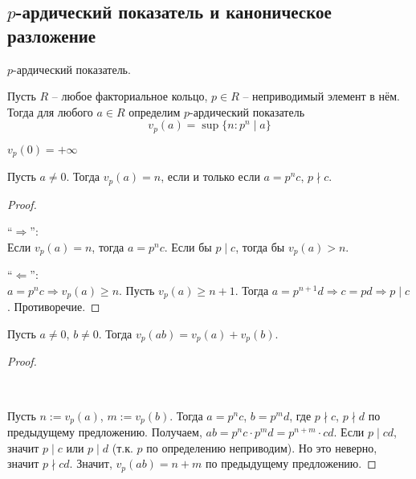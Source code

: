 
\begin{normalsize}
\section{$p$-ардический показатель и каноническое разложение}

\begin{conj}
    $p$-ардический показатель.
\end{conj}
    
Пусть $R$ -- любое факториальное кольцо, $p \in R$ --
неприводимый элемент в нём. Тогда для любого $a \in R$
определим $p$-ардический показатель
\[v_p(a) = \sup\{ n : p^n \mid a \}\]

\notice $v_p(0) = +\infty$

\begin{theorem-non}
Пусть $a \neq 0$. Тогда $v_p(a) = n$, если и только если $a = p^n c$,
$ p \nmid c $.
\end{theorem-non}
\begin{proof} $ $

``$\Longrightarrow$'':\\
Если $v_p(a) = n$, тогда $a = p^n c$.
Если бы $p \mid c$, тогда бы $v_p(a) > n$.

``$\Longleftarrow$'':\\
$a = p^n c \Rightarrow v_p(a) \geqslant n$. Пусть $v_p(a) \geqslant 
n + 1$. Тогда $a = p^{n + 1}d \Rightarrow c = pd \Rightarrow p \mid c$.
Противоречие.
\end{proof}

\begin{theorem-non}
Пусть $a \neq 0$, $b \neq 0$. Тогда $v_p(ab) = v_p(a) + v_p(b)$.
\end{theorem-non}
\begin{proof} $ $

\\
 \par

Пусть $n := v_p(a)$, $m := v_p(b)$. Тогда $a = p^n c$, $b = p^m d$,
где $p \nmid c$, $p \nmid d$ по предыдущему предложению. 
Получаем, $ab = p^n c \cdot p^m d = p^{n + m} \cdot cd$. 
Если $p \mid cd$, значит $p \mid c$ или $p \mid d$
(т.к. $p$ по определению неприводим).
Но это неверно, значит $p \nmid cd$. Значит, $v_p(ab) = n + m$
по предыдущему предложению.


\end{proof}
\end{normalsize}
